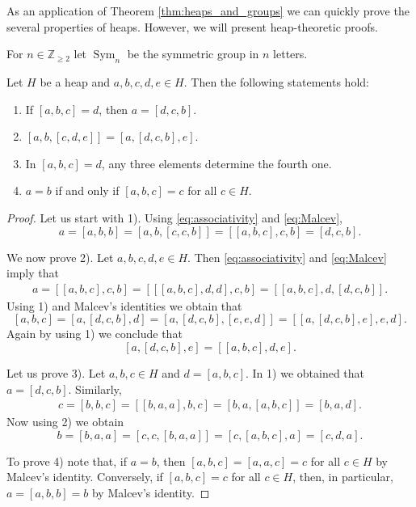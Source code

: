 \documentclass{svmult}
\newcommand{\Z}{\mathbb{Z}}
\newcommand{\Sym}{\operatorname{Sym}}
\begin{document}
As an application of Theorem \ref{thm:heaps_and_groups} we can quickly prove
the several properties of heaps. However, we will 
present heap-theoretic proofs. 

For $n\in\Z_{\geq2}$ let 
$\Sym_n$ be the symmetric group in $n$ letters. 

\begin{theorem}
\label{thm:properties}
Let $H$ be a heap and $a,b,c,d,e\in H$. Then the following statements hold:
\begin{enumerate}
    \item If $[a,b,c]=d$, then $a=[d,c,b]$. 
    \item $[a,b,[c,d,e]]=[a,[d,c,b],e]$.
    \item In $[a,b,c]=d$, any three elements determine the fourth one. 
    \item $a=b$ if and only 
        if $[a,b,c]=c$ for all $c\in H$. 
\end{enumerate}
\end{theorem}

\begin{proof}
Let us start with 1). Using \eqref{eq:associativity} and \eqref{eq:Malcev}, 
\[
a=[a,b,b]=[a,b,[c,c,b]]=[[a,b,c],c,b]=[d,c,b].
\]

We now prove 2). Let $a,b,c,d,e\in H$. Then \eqref{eq:associativity} and \eqref{eq:Malcev} imply that
\begin{align*}
    a=[[a,b,c],c,b]=\left[[[a,b,c],d,d],c,b\right]=\left[[a,b,c],d,[d,c,b]\right].
\end{align*}
Using 1) and Malcev's identities we obtain that
\[
[a,b,c]=\left[a,[d,c,b],d\right]=\left[a,[d,c,b],[e,e,d]\right]=\left[[a,[d,c,b],e],e,d\right].
\]
Again by using 1) we conclude that
\[
[a,[d,c,b],e]=\left[[a,b,c],d,e\right].
\]


Let us prove 3). Let $a,b,c\in H$ and $d=[a,b,c]$. In 1) 
we obtained that $a=[d,c,b]$. Similarly,  
\begin{align*}
\label{eq:Iknow3}
c=[b,b,c]=[[b,a,a],b,c]=[b,a,[a,b,c]]=[b,a,d].
\end{align*}
Now using 2) we obtain
\[
b=[b,a,a]=[c,c,[b,a,a]]=[c,[a,b,c],a]=[c,d,a].
\]

To prove 4) note that, if $a=b$, then $[a,b,c]=[a,a,c]=c$ for all $c\in H$ 
by Malcev's identity. Conversely,
if $[a,b,c]=c$ for all $c\in H$, then, 
in particular, $a=[a,b,b]=b$ by Malcev's identity. 
\end{proof}
\end{document}

